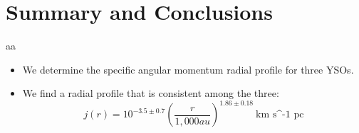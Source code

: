 \section{Summary and Conclusions}
aa
\begin{itemize}
\item We determine the specific angular momentum radial profile for three YSOs. 
\item We find a radial profile that is consistent among the three:
\[ j(r) = 10^{-3.5\pm0.7}\left( \frac{r}{1,000 au}\right)^{1.86\pm 0.18}~\textrm{km s^{-1} pc}\]
\end{itemize}